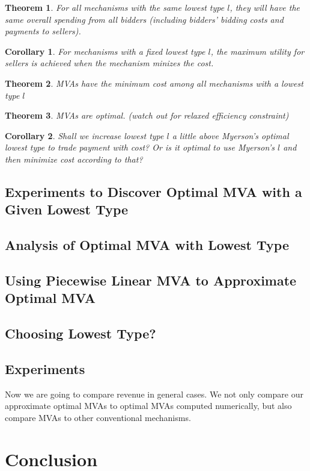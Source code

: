 \documentclass{aamas2012}
\newtheorem{theorem}{Theorem}
\newtheorem{corollary}{Corollary}
\begin{document}
\begin{theorem}

For all mechanisms with the same lowest type $l$, they will have the same
overall spending from all bidders (including bidders' bidding costs and
payments to sellers).

\end{theorem}

\begin{corollary}

For mechanisms with a fixed lowest type $l$, the maximum utility for sellers is
achieved when the mechanism minizes the cost.

\end{corollary}

\begin{theorem}

MVAs have the minimum cost among all mechanisms with a lowest type $l$

\end{theorem}

\begin{theorem}

MVAs are optimal. (watch out for relaxed efficiency constraint)

\end{theorem}

\begin{corollary}

Shall we increase lowest type $l$ a little above Myerson's optimal lowest type
to trade payment with cost? Or is it optimal to use Myerson's $l$ and then
minimize cost according to that?

\end{corollary}

\subsection{Experiments to Discover Optimal MVA with a Given Lowest Type}

\subsection{Analysis of Optimal MVA with Lowest Type}

\subsection{Using Piecewise Linear MVA to Approximate Optimal MVA}

\subsection{Choosing Lowest Type?}

\subsection{Experiments}

Now we are going to compare revenue in general cases. We not only compare our
approximate optimal MVAs to optimal MVAs computed numerically, but also compare
MVAs to other conventional mechanisms.

\section{Conclusion}
\end{document}
